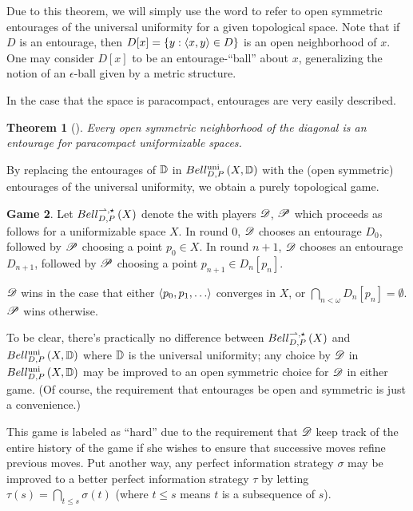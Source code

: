 \documentclass{amsart}
\newtheorem{theorem}{Theorem}[section]
\theoremstyle{definition}
\newtheorem{game}[theorem]{Game}
\begin{document}
  Due to this theorem, we will simply use the word  to refer
  to open symmetric entourages of the universal uniformity for
  a given topological space. Note that if \(D\) is an
  entourage, then \(D[x]=\{y:\langle x,y\rangle\in D\}\) is an open neighborhood of \(x\).
  One may consider
  \(D[x]\) to be an entourage-``ball'' about \(x\), generalizing the notion of
  an \(\epsilon\)-ball given by a metric structure.

  In the case that
  the space is paracompact, entourages are very easily described.

  \begin{theorem}[\cite{MR2048350}]
    Every open symmetric neighborhood of the diagonal is an entourage for
    paracompact uniformizable spaces.
  \end{theorem}

  By replacing the entourages of \(\mathbb{D}\) in \(Bell_{D,P}^{\textrm{uni}}\left({X,\mathbb{D}}\right)\)
  with the
  (open symmetric) entourages of the universal uniformity, we obtain
  a purely topological game.

  \begin{game}
    Let \(Bell_{D,P}^{\rightharpoonup,\star}\left({X}\right)\) denote the  with
    players \(\mathscr{D}\), \(\mathscr{P}\) which proceeds as follows for
    a uniformizable space \(X\). In round \(0\),
    \(\mathscr{D}\) chooses an entourage \(D_0\), followed by \(\mathscr{P}\)
    choosing a point \(p_0\in X\). In round \(n+1\),
    \(\mathscr{D}\) chooses an entourage
    \(D_{n+1}\), followed by \(\mathscr{P}\) choosing a point \(p_{n+1}\in D_n[p_n]\).

    \(\mathscr{D}\) wins in the case that either
    \(\<p_0,p_1,\dots\>\) converges in \(X\),
    or \(\bigcap_{n<\omega}D_n[p_n] = \emptyset\). \(\mathscr{P}\) wins otherwise.
  \end{game}

  To be clear,
  there's practically no difference between \(Bell_{D,P}^{\rightharpoonup,\star}\left({X}\right)\) and
  \(Bell_{D,P}^{\textrm{uni}}\left({X,\mathbb{D}}\right)\) where \(\mathbb{D}\) is the universal uniformity;
  any choice by \(\mathscr{D}\) in \(Bell_{D,P}^{\textrm{uni}}\left({X,\mathbb{D}}\right)\) may be improved to
  an open symmetric choice for \(\mathscr{D}\) in either game. (Of course, the
  requirement that entourages be open and symmetric is just a convenience.)

  This game is labeled as ``hard'' due to the requirement that \(\mathscr{D}\)
  keep track of the entire history of the game if she wishes to
  ensure that successive moves refine previous moves.
  Put another way, any perfect information strategy \(\sigma\)
  may be improved to a better perfect information strategy \(\tau\) by letting
  \(\tau(s)=\bigcap_{t\leq s}\sigma(t)\) (where \(t\leq s\) means \(t\) is a
  subsequence of \(s\)).
\end{document}

